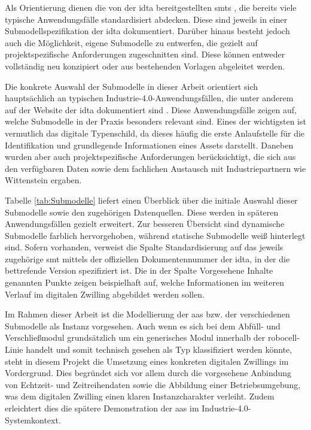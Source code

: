 Als Orientierung dienen die von der \acs{idta} bereitgestellten \acsp{smt} \cite{idtaTemplates}, die bereits viele typische Anwendungsfälle standardisiert abdecken.
Diese sind jeweils in einer Submodellspezifikation der \acs{idta} dokumentiert.
Darüber hinaus besteht jedoch auch die Möglichkeit, eigene Submodelle zu entwerfen, die gezielt auf projektspezifische Anforderungen zugeschnitten sind.
Diese können entweder vollständig neu konzipiert oder aus bestehenden Vorlagen abgeleitet werden.

Die konkrete Auswahl der Submodelle in dieser Arbeit orientiert sich hauptsächlich an typischen Industrie-4.0-Anwendungsfällen, die unter anderem auf der Website der \acs{idta} dokumentiert sind \cite{idtaUseCases}.
Diese Anwendungsfälle zeigen auf, welche Submodelle in der Praxis besonders relevant sind.
Eines der wichtigsten ist vermutlich das digitale Typenschild, da dieses häufig die erste Anlaufstelle für die Identifikation und grundlegende Informationen eines Assets darstellt.
Daneben wurden aber auch projektspezifische Anforderungen berücksichtigt, die sich aus den verfügbaren Daten sowie dem fachlichen Austausch mit Industriepartnern wie Wittenstein ergaben.

Tabelle \ref{tab:Submodelle} liefert einen Überblick über die initiale Auswahl dieser Submodelle sowie den zugehörigen Datenquellen.
Diese werden in späteren Anwendungsfällen gezielt erweitert.
Zur besseren Übersicht sind dynamische Submodelle farblich hervorgehoben, während statische Submodelle weiß hinterlegt sind.
Sofern vorhanden, verweist die Spalte Standardisierung auf das jeweils zugehörige \acs{smt} mittels der offiziellen Dokumentennummer der \acs{idta}, in der die bettrefende Version spezifiziert ist.
Die in der Spalte Vorgesehene Inhalte genannten Punkte zeigen beispielhaft auf, welche Informationen im weiteren Verlauf im digitalen Zwilling abgebildet werden sollen.



\newpage
Im Rahmen dieser Arbeit ist die Modellierung der \acs{aas} bzw. der verschiedenen Submodelle als Instanz vorgesehen.
Auch wenn es sich bei dem Abfüll- und Verschließmodul grundsätzlich um ein generisches Modul innerhalb der robocell-Linie handelt und somit technisch gesehen als Typ klassifiziert werden könnte, steht in diesem Projekt die Umsetzung eines konkreten digitalen Zwillings im Vordergrund.
Dies begründet sich vor allem durch die vorgesehene Anbindung von Echtzeit- und Zeitreihendaten sowie die Abbildung einer Betriebsumgebung, was dem digitalen Zwilling einen klaren Instanzcharakter verleiht.
Zudem erleichtert dies die spätere Demonstration der \acs{aas} im Industrie-4.0-Systemkontext.

